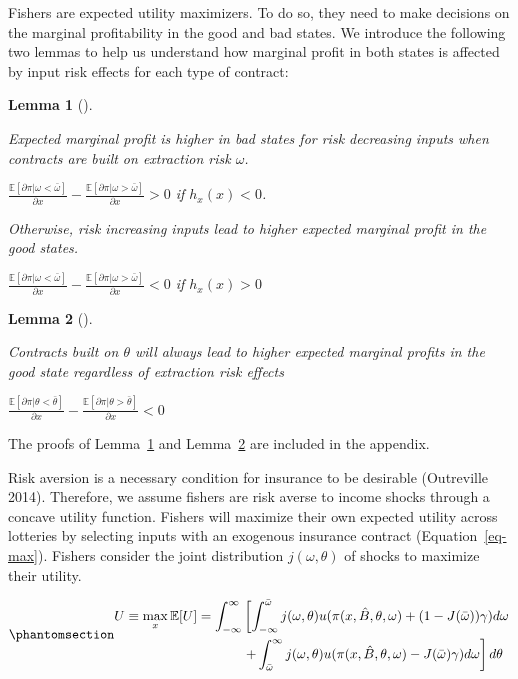 \documentclass[
  letterpaper,
  DIV=11,
  numbers=noendperiod]{scrartcl}
\theoremstyle{plain}
\newtheorem{lemma}{Lemma}[section]
\theoremstyle{plain}
\theoremstyle{remark}
\begin{document}
Fishers are expected utility maximizers. To do so, they need to make
decisions on the marginal profitability in the good and bad states. We
introduce the following two lemmas to help us understand how marginal
profit in both states is affected by input risk effects for each type of
contract:

\begin{lemma}[]\protect\hypertarget{lem-mp}{}\label{lem-mp}

Expected marginal profit is higher in bad states for risk decreasing
inputs when contracts are built on extraction risk \(\omega\).

\(\frac{\mathbb{E}[\partial \pi|\omega<\bar \omega]}{\partial x}-\frac{\mathbb{E}[\partial \pi|\omega>\bar \omega]}{\partial x}>0\)
if \(h_{x}(x)<0\).

Otherwise, risk increasing inputs lead to higher expected marginal
profit in the good states.

\(\frac{\mathbb{E}[\partial \pi|\omega<\bar \omega]}{\partial x}-\frac{\mathbb{E}[\partial \pi|\omega>\bar \omega]}{\partial x}<0\)
if \(h_{x}(x)>0\)

\end{lemma}

\begin{lemma}[]\protect\hypertarget{lem-theta}{}\label{lem-theta}

Contracts built on \(\theta\) will always lead to higher expected
marginal profits in the good state regardless of extraction risk effects

\(\frac{\mathbb{E}[\partial \pi|\theta<\bar \theta]}{\partial x}-\frac{\mathbb{E}[\partial \pi|\theta>\bar \theta]}{\partial x}<0\)

\end{lemma}

The proofs of Lemma~\ref{lem-mp} and Lemma~\ref{lem-theta} are included
in the appendix.

Risk aversion is a necessary condition for insurance to be desirable
(Outreville 2014). Therefore, we assume fishers are risk averse to
income shocks through a concave utility function. Fishers will maximize
their own expected utility across lotteries by selecting inputs with an
exogenous insurance contract (Equation~\ref{eq-max}). Fishers consider
the joint distribution \(j(\omega,\theta)\) of shocks to maximize their
utility.

\begin{equation}\phantomsection\label{eq-max}{
\begin{aligned}
U\equiv\max_{x}\mathbb{E}[U]=\int^{\infty}_{-\infty}&\left[ \int^{\bar \omega}_{-\infty}j(\omega,\theta)u(\pi(x,\hat{B},\theta,\omega)+(1-J(\bar \omega))\gamma)d\omega \right.\\
&\left.+\int^{\infty}_{\bar{\omega}}j(\omega,\theta) u(\pi(x,\hat{B},
\theta,\omega)-J(\bar \omega)\gamma)d \omega\right] d\theta
\end{aligned}
}\end{equation}
\end{document}
